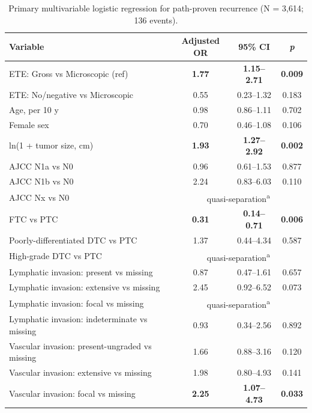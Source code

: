 \begin{table}[htbp]
\centering
\caption{Primary multivariable logistic regression for path-proven recurrence (N = 3{,}614; 136 events).}
\label{tab:primary}
\begin{threeparttable}
\begin{tabular}{@{}lccc@{}}
\toprule
\textbf{Variable} & \textbf{Adjusted OR} & \textbf{95\% CI} & \textbf{\textit{p}} \\
\midrule
ETE: Gross vs Microscopic (ref) & \textbf{1.77} & \textbf{1.15--2.71} & \textbf{0.009} \\
ETE: No/negative vs Microscopic & 0.55 & 0.23--1.32 & 0.183 \\
Age, per 10 y & 0.98 & 0.86--1.11 & 0.702 \\
Female sex & 0.70 & 0.46--1.08 & 0.106 \\
ln(1 + tumor size, cm) & \textbf{1.93} & \textbf{1.27--2.92} & \textbf{0.002} \\
AJCC N1a vs N0 & 0.96 & 0.61--1.53 & 0.877 \\
AJCC N1b vs N0 & 2.24 & 0.83--6.03 & 0.110 \\
AJCC Nx vs N0 & \multicolumn{3}{c}{quasi-separation\textsuperscript{a}} \\
FTC vs PTC & \textbf{0.31} & \textbf{0.14--0.71} & \textbf{0.006} \\
Poorly-differentiated DTC vs PTC & 1.37 & 0.44--4.34 & 0.587 \\
High-grade DTC vs PTC & \multicolumn{3}{c}{quasi-separation\textsuperscript{a}} \\
Lymphatic invasion: present vs missing & 0.87 & 0.47--1.61 & 0.657 \\
Lymphatic invasion: extensive vs missing & 2.45 & 0.92--6.52 & 0.073 \\
Lymphatic invasion: focal vs missing & \multicolumn{3}{c}{quasi-separation\textsuperscript{a}} \\
Lymphatic invasion: indeterminate vs missing & 0.93 & 0.34--2.56 & 0.892 \\
Vascular invasion: present-ungraded vs missing & 1.66 & 0.88--3.16 & 0.120 \\
Vascular invasion: extensive vs missing & 1.98 & 0.80--4.93 & 0.141 \\
Vascular invasion: focal vs missing & \textbf{2.25} & \textbf{1.07--4.73} & \textbf{0.033} \\

\end{tabular}
\end{threeparttable}
\end{table}
